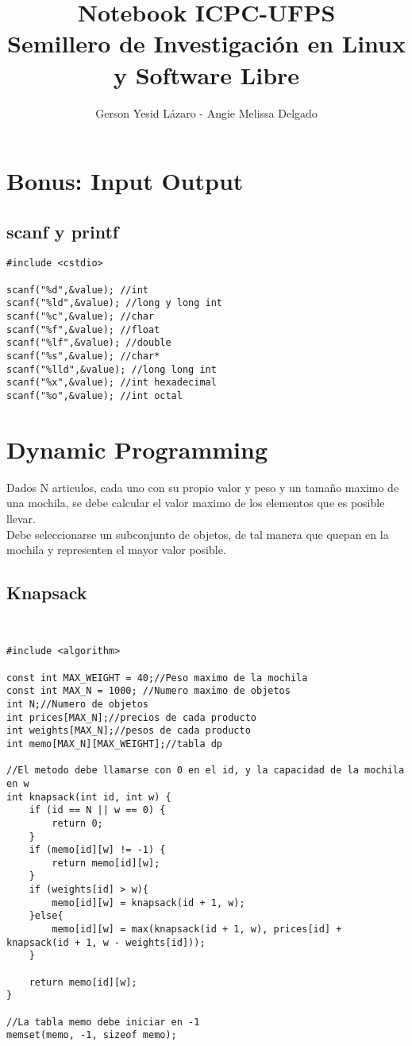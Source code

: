 \documentclass[11pt,letterpaper,twocolumn,twosided]{article}
\begin{document}
\title{Notebook ICPC-UFPS\\Semillero de Investigaci\'on en Linux y Software Libre}
\author{Gerson Yesid L\'azaro - Angie Melissa Delgado}
\maketitle
\tableofcontents
{}


\section{Bonus: Input Output}

\subsection{scanf y printf}
\begin{lstlisting}
#include <cstdio>

scanf("%d",&value); //int
scanf("%ld",&value); //long y long int
scanf("%c",&value); //char 
scanf("%f",&value); //float
scanf("%lf",&value); //double
scanf("%s",&value); //char*
scanf("%lld",&value); //long long int
scanf("%x",&value); //int hexadecimal
scanf("%o",&value); //int octal
\end{lstlisting}

\section{Dynamic Programming}
Dados N articulos, cada uno con su propio valor y peso y un tamaño maximo de una mochila, se debe calcular el valor maximo de los elementos que es posible llevar.\\
Debe seleccionarse un subconjunto de objetos, de tal manera que quepan en la mochila y representen el mayor valor posible.

\subsection{Knapsack}
\begin{lstlisting}


#include <algorithm>

const int MAX_WEIGHT = 40;//Peso maximo de la mochila
const int MAX_N = 1000; //Numero maximo de objetos
int N;//Numero de objetos 
int prices[MAX_N];//precios de cada producto
int weights[MAX_N];//pesos de cada producto
int memo[MAX_N][MAX_WEIGHT];//tabla dp

//El metodo debe llamarse con 0 en el id, y la capacidad de la mochila en w
int knapsack(int id, int w) {
  	if (id == N || w == 0) {
  		return 0;
  	}
  	if (memo[id][w] != -1) {
  		return memo[id][w];
  	}
  	if (weights[id] > w){
  		memo[id][w] = knapsack(id + 1, w);
  	}else{
  		memo[id][w] = max(knapsack(id + 1, w), prices[id] + knapsack(id + 1, w - weights[id]));
  	}
  	
  	return memo[id][w];
}

//La tabla memo debe iniciar en -1
memset(memo, -1, sizeof memo);
\end{lstlisting}
\end{document}
